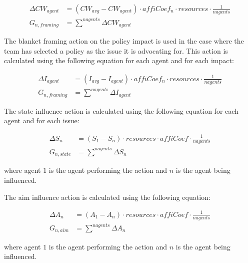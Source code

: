 \begin{equation} \begin{split}
 \Delta CW_{agent} &=  \left(CW_{avg} - CW_{agent} \right) \cdot affiCoef_n \cdot resources \cdot \frac{1}{nagents} \\
 G_{n,framing} &= \sum^{nagents}  \Delta CW_{agent}
\end{split}\end{equation}

The blanket framing action on the policy impact is  used in the case where the team has selected a policy as the issue it is advocating for. This action is calculated using the following equation for each agent and for each impact:

\begin{equation} \begin{split}
 \Delta I_{agent} &=  \left(I_{avg} - I_{agent} \right) \cdot affiCoef_n \cdot resources \cdot \frac{1}{nagents} \\
 G_{n,framing} &= \sum^{nagents}  \Delta I_{agent}
\end{split}\end{equation}

The state influence action is calculated using the following equation for each agent and for each issue:

\begin{equation} \begin{split}
\Delta S_{n} &=  \left(S_{1} - S_{n} \right) \cdot resources \cdot affiCoef \cdot \frac{1}{nagents}\\
 G_{n,state} &= \sum^{nagents}  \Delta S_{n}
\end{split} \end{equation}

where agent $1$ is the agent performing the action and $n$ is the agent being influenced.

The aim influence action is calculated using the following equation:

\begin{equation} \begin{split}
\Delta A_{n} &=  \left(A_{1} - A_{n} \right) \cdot resources \cdot affiCoef \cdot \frac{1}{nagents}\\
 G_{n,aim} &= \sum^{nagents}  \Delta A_{n}
\end{split}
\end{equation}

where agent $1$ is the agent performing the action and $n$ is the agent being influenced.


